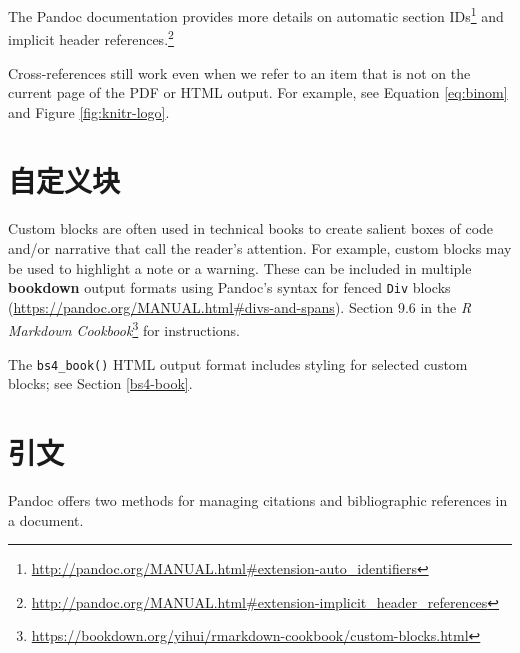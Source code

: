 \documentclass[
  12pt,
]{krantz}
\renewcommand{\href}[2]{#2\footnote{\url{#1}}}
\theoremstyle{definition}
\theoremstyle{definition}
\theoremstyle{definition}
\theoremstyle{definition}
\theoremstyle{remark}
\begin{document}
The Pandoc documentation provides more details on \href{http://pandoc.org/MANUAL.html\#extension-auto_identifiers}{automatic section IDs} and \href{http://pandoc.org/MANUAL.html\#extension-implicit_header_references}{implicit header references.}

Cross-references still work even when we refer to an item that is not on the current page of the PDF or HTML output. For example, see Equation \eqref{eq:binom} and Figure \ref{fig:knitr-logo}.

\hypertarget{ux81eaux5b9aux4e49ux5757}{%
\section{自定义块}\label{ux81eaux5b9aux4e49ux5757}}

Custom blocks are often used in technical books to create salient boxes of code and/or narrative that call the reader's attention. For example, custom blocks may be used to highlight a note or a warning. These can be included in multiple \textbf{bookdown} output formats using Pandoc's syntax for fenced \texttt{Div} blocks (\url{https://pandoc.org/MANUAL.html\#divs-and-spans}). Section 9.6 in the \href{https://bookdown.org/yihui/rmarkdown-cookbook/custom-blocks.html}{\emph{R Markdown Cookbook}} \citep{rmarkdown2020} for instructions.

The \texttt{bs4\_book()} HTML output format includes styling for selected custom blocks; see Section \ref{bs4-book}.

\hypertarget{citations}{%
\section{引文}\label{citations}}

Pandoc offers two methods for managing citations and bibliographic references in a document.
\end{document}
